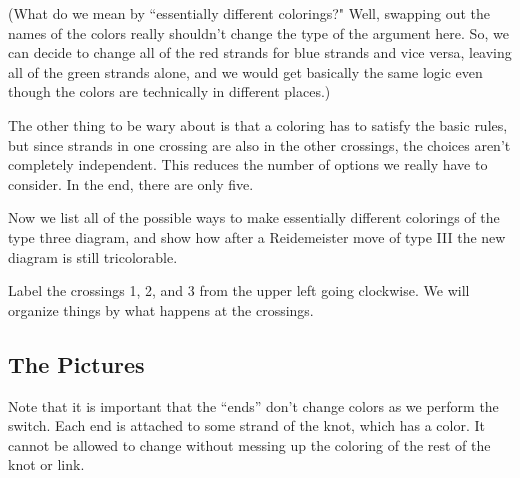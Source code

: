 \documentclass[12pt,letterpaper]{article}
\theoremstyle{definition}
\begin{document}
(What do we mean by ``essentially different colorings?" Well, swapping out the names of the colors really shouldn't change the type of the argument here. So, we can decide to change all of the red strands for blue strands and vice versa, leaving all of the green strands alone, and we would get basically the same logic even though the colors are technically in different places.)

The other thing to be wary about is that a coloring has to satisfy the basic rules, but since strands in one crossing are also in the other crossings, the choices aren't completely independent. This reduces the number of options we really have to consider.
In the end, there are only five.

Now we list all of the possible ways to make essentially different colorings of the type three diagram, and show how after a Reidemeister move of type III the new diagram is still tricolorable.

Label the crossings 1, 2, and 3 from the upper left going clockwise.
We will organize things by what happens at the crossings.

\clearpage

\subsection*{The Pictures}
Note that it is important that the ``ends'' don't change colors as we perform the switch.
Each end is attached to some strand of the knot, which has a color.
It cannot be allowed to change without messing up the coloring of the rest of the knot or link.
\end{document}
